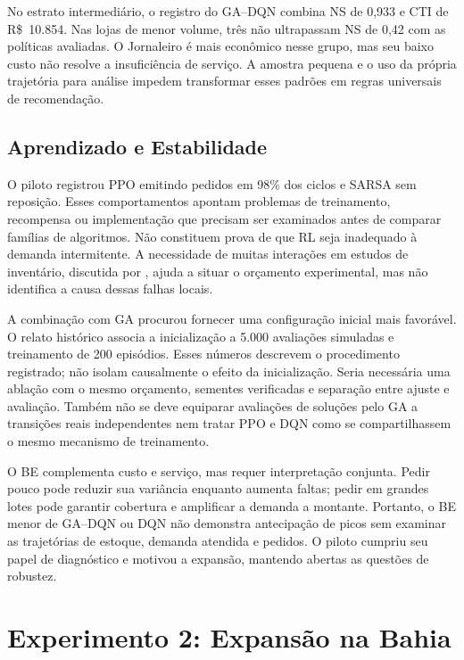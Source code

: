 No estrato intermediário, o registro do GA--DQN combina NS de 0,933 e CTI de R\$~10.854. Nas lojas de menor volume, três não ultrapassam NS de 0,42 com as políticas avaliadas. O Jornaleiro é mais econômico nesse grupo, mas seu baixo custo não resolve a insuficiência de serviço. A amostra pequena e o uso da própria trajetória para análise impedem transformar esses padrões em regras universais de recomendação.

\subsection{Aprendizado e Estabilidade}

O piloto registrou PPO emitindo pedidos em 98\% dos ciclos e SARSA sem reposição. Esses comportamentos apontam problemas de treinamento, recompensa ou implementação que precisam ser examinados antes de comparar famílias de algoritmos. Não constituem prova de que RL seja inadequado à demanda intermitente. A necessidade de muitas interações em estudos de inventário, discutida por \citet{Oroojlooyjadid2022BeerGameDQN}, ajuda a situar o orçamento experimental, mas não identifica a causa dessas falhas locais.

A combinação com GA procurou fornecer uma configuração inicial mais favorável. O relato histórico associa a inicialização a 5.000 avaliações simuladas e treinamento de 200 episódios. Esses números descrevem o procedimento registrado; não isolam causalmente o efeito da inicialização. Seria necessária uma ablação com o mesmo orçamento, sementes verificadas e separação entre ajuste e avaliação. Também não se deve equiparar avaliações de soluções pelo GA a transições reais independentes nem tratar PPO e DQN como se compartilhassem o mesmo mecanismo de treinamento.

O BE complementa custo e serviço, mas requer interpretação conjunta. Pedir pouco pode reduzir sua variância enquanto aumenta faltas; pedir em grandes lotes pode garantir cobertura e amplificar a demanda a montante. Portanto, o BE menor de GA--DQN ou DQN não demonstra antecipação de picos sem examinar as trajetórias de estoque, demanda atendida e pedidos. O piloto cumpriu seu papel de diagnóstico e motivou a expansão, mantendo abertas as questões de robustez.

\section{Experimento 2: Expansão na Bahia}

